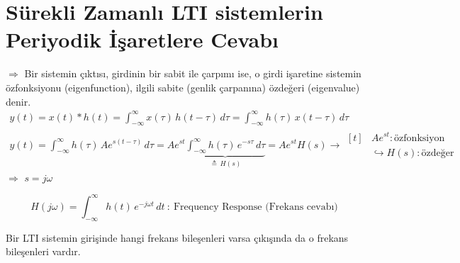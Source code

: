 \documentclass[11pt,a4paper]{article}
\begin{document}
\section{Sürekli Zamanlı LTI sistemlerin Periyodik İşaretlere Cevabı}
\begin{center}
\end{center}
$\Rightarrow$ Bir sistemin çıktısı, girdinin bir sabit ile çarpımı ise, o girdi işaretine sistemin özfonksiyonu (eigenfunction), ilgili sabite (genlik çarpanına) özdeğeri (eigenvalue) denir.
\begin{gather*}
  y(t) = x(t) \ast h(t) = \int_{-\infty}^{\infty} x(\tau)\,h(t-\tau)\,d\tau = \int_{-\infty}^{\infty} h(\tau)\,x(t-\tau)\,d\tau \\
  y(t) = \int_{-\infty}^{\infty} h(\tau)\,A e^{s(t-\tau)}\,d\tau = A e^{st}\underbrace{\int_{-\infty}^{\infty} h(\tau)\,e^{-s\tau}\,d\tau}_{\triangleq\,H(s)} = A e^{st} H(s) \longrightarrow \begin{aligned}[t] & A e^{st}: \text{özfonksiyon} \\ & \hookrightarrow H(s): \text{özdeğer} \end{aligned}
\end{gather*}
$\Rightarrow$ $s = j\omega$
\begin{center}
\end{center}
\[ H(j\omega) = \int_{-\infty}^{\infty} h(t)\,e^{-j\omega t}\,dt \ : \ \text{Frequency Response (Frekans cevabı)} \]
\begin{center}
\end{center}
Bir LTI sistemin girişinde hangi frekans bileşenleri varsa çıkışında da o frekans bileşenleri vardır.
\end{document}
